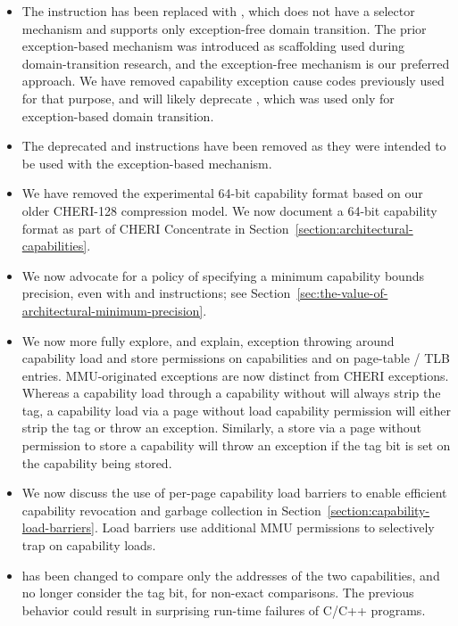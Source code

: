 \begin{itemize}
\item The  instruction has been replaced with
  , which does not have a selector mechanism and supports
  only exception-free domain transition.
  The prior exception-based mechanism was introduced as scaffolding used
  during domain-transition research, and the exception-free mechanism is our
  preferred approach.
  We have removed capability exception cause codes previously used
  for that purpose, and will likely deprecate , which was
  used only for exception-based domain transition.

\item The deprecated  and 
  instructions have been removed as they were intended to be used with the
  exception-based  mechanism.

\item We have removed the experimental 64-bit capability format based on our
  older CHERI-128 compression model.
  We now document a 64-bit capability format as part of CHERI Concentrate in
  Section~\ref{section:architectural-capabilities}.

\item We now advocate for a policy of specifying a minimum capability bounds
  precision, even with  and  instructions; see
  Section~\ref{sec:the-value-of-architectural-minimum-precision}.

\item We now more fully explore, and explain, exception throwing around
  capability load and store permissions on capabilities and on page-table /
  TLB entries.
  MMU-originated exceptions are now distinct from CHERI exceptions.
  Whereas a capability load through a capability without \cappermLC will always strip
  the tag, a capability load via a page without load capability permission
  will either strip the tag or throw an exception.
  Similarly, a store via a page without permission to store a capability will
  throw an exception if the tag bit is set on the capability being stored.

\item We now discuss the use of per-page capability load barriers to
  enable efficient capability revocation and garbage collection in
  Section~\ref{section:capability-load-barriers}.  Load
  barriers use additional MMU permissions to selectively trap on
  capability loads.

\item {} has been changed to compare only the addresses of
  the two capabilities, and no longer consider the tag bit, for non-exact
  comparisons.
  The previous behavior could result in surprising run-time failures of C/C++
  programs.


\end{itemize}
